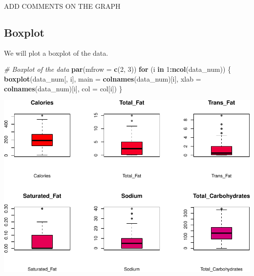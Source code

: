 \documentclass[
]{article}
\newenvironment{Shaded}{\begin{snugshade}}{\end{snugshade}}
\newcommand{\AttributeTok}[1]{\textcolor[rgb]{0.13,0.29,0.53}{#1}}
\newcommand{\CommentTok}[1]{\textcolor[rgb]{0.56,0.35,0.01}{\textit{#1}}}
\newcommand{\ControlFlowTok}[1]{\textcolor[rgb]{0.13,0.29,0.53}{\textbf{#1}}}
\newcommand{\DecValTok}[1]{\textcolor[rgb]{0.00,0.00,0.81}{#1}}
\newcommand{\FunctionTok}[1]{\textcolor[rgb]{0.13,0.29,0.53}{\textbf{#1}}}
\newcommand{\NormalTok}[1]{#1}
\newcommand{\SpecialCharTok}[1]{\textcolor[rgb]{0.81,0.36,0.00}{\textbf{#1}}}
\begin{document}
ADD COMMENTS ON THE GRAPH

\subsection{Boxplot}\label{boxplot}

We will plot a boxplot of the data.

\begin{Shaded}
\begin{Highlighting}[]
\CommentTok{\# Boxplot of the data}
\FunctionTok{par}\NormalTok{(}\AttributeTok{mfrow =} \FunctionTok{c}\NormalTok{(}\DecValTok{2}\NormalTok{, }\DecValTok{3}\NormalTok{))}
\ControlFlowTok{for}\NormalTok{ (i }\ControlFlowTok{in} \DecValTok{1}\SpecialCharTok{:}\FunctionTok{ncol}\NormalTok{(data\_num)) \{}
  \FunctionTok{boxplot}\NormalTok{(data\_num[, i], }\AttributeTok{main =} \FunctionTok{colnames}\NormalTok{(data\_num)[i],}
          \AttributeTok{xlab =} \FunctionTok{colnames}\NormalTok{(data\_num)[i], }\AttributeTok{col =}\NormalTok{ col[i])}
\NormalTok{\}}
\end{Highlighting}
\end{Shaded}

\begin{center}\includegraphics{Statistical_Learning_Final_Report_files/figure-latex/boxplot-1} \end{center}
\end{document}
